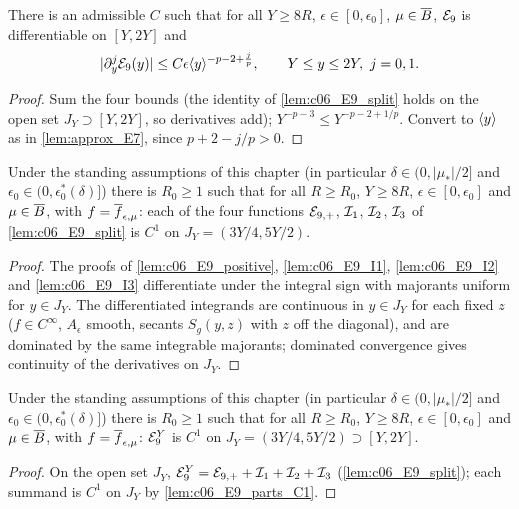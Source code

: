 \begin{lemma}[Control of $\mc E_9$]
  \label{lem:approx_E9}
  There is an admissible $C$ such that for all $Y\ge8R$, $\epsilon\in[0,\epsilon_0]$, $\mu\in\overline{B}$, $\mc E_9$ is differentiable on $[Y,2Y]$ and
  \[|\partial_y^j\mathcal{E}_9(y)|\le C\epsilon\langle y \rangle^{-p-2+\frac jp},\qquad Y\le y\le2Y,\ j=0,1.\]
\end{lemma}
\begin{proof}
  Sum the four bounds (the identity of \cref{lem:c06_E9_split} holds on the open set $J_Y\supset[Y,2Y]$, so derivatives add);
  $Y^{-p-3}\le Y^{-p-2+1/p}$. Convert to $\langle y \rangle$ as in \cref{lem:approx_E7}, since $p+2-j/p>0$.
\end{proof}

\begin{lemma}
  \label{lem:c06_E9_parts_C1}
  Under the standing assumptions of this chapter (in particular $\delta\in(0,|\mu_*|/2]$ and
  $\epsilon_0\in(0,\epsilon_0^*(\delta)]$) there is $R_0\ge1$ such that for all $R\ge R_0$, $Y\ge8R$,
  $\epsilon\in[0,\epsilon_0]$ and $\mu\in\overline{B}$, with $f=\overline{f}_{\epsilon,\mu}$: each of the four functions $\mathcal{E}_{9,+}$, $\mathcal{I}_1$, $\mathcal{I}_2$, $\mathcal{I}_3$ of
  \cref{lem:c06_E9_split} is $C^1$ on $J_Y=(3Y/4,5Y/2)$.
\end{lemma}
\begin{proof}
  The proofs of \cref{lem:c06_E9_positive}, \cref{lem:c06_E9_I1}, \cref{lem:c06_E9_I2} and \cref{lem:c06_E9_I3}
  differentiate under the integral sign with majorants uniform for $y\in J_Y$. The differentiated integrands are
  continuous in $y\in J_Y$ for each fixed $z$ ($f\in C^\infty$, $A_\epsilon$ smooth, secants $S_g(y,z)$ with $z$ off the
  diagonal), and are dominated by the same integrable majorants; dominated convergence gives continuity of the
  derivatives on $J_Y$.
\end{proof}

\begin{lemma}[$\mc E_9$ is $C^1$ on $J_Y$]
  \label{lem:c06_E9_C1}
  Under the standing assumptions of this chapter (in particular $\delta\in(0,|\mu_*|/2]$ and
  $\epsilon_0\in(0,\epsilon_0^*(\delta)]$) there is $R_0\ge1$ such that for all $R\ge R_0$, $Y\ge8R$,
  $\epsilon\in[0,\epsilon_0]$ and $\mu\in\overline{B}$, with $f=\overline{f}_{\epsilon,\mu}$: $\mathcal{E}_9^Y$ is $C^1$ on $J_Y=(3Y/4,5Y/2)\supset[Y,2Y]$.
\end{lemma}
\begin{proof}
  On the open set $J_Y$, $\mathcal{E}_9^Y=\mathcal{E}_{9,+}+\mathcal{I}_1+\mathcal{I}_2+\mathcal{I}_3$ (\cref{lem:c06_E9_split}); each summand is $C^1$ on
  $J_Y$ by \cref{lem:c06_E9_parts_C1}.
\end{proof}
